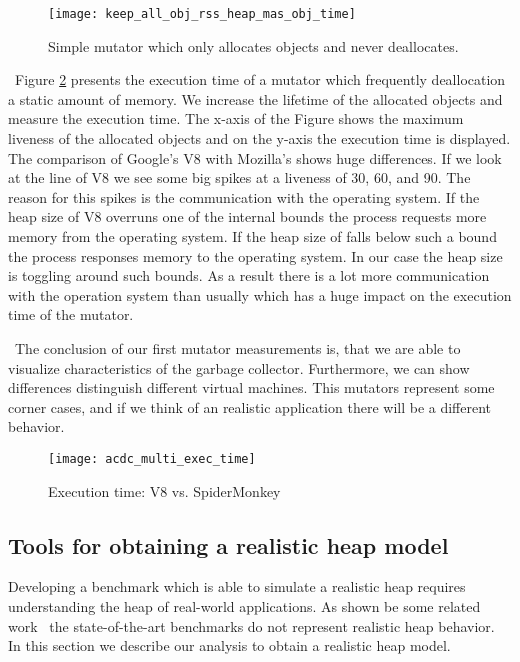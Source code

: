 \begin{figure}
	\centering
	\texttt{[image: keep\_all\_obj\_rss\_heap\_mas\_obj\_time]}
	\caption{Simple mutator which only allocates objects and never deallocates.}
	\label{fig:mutator_keep_all_obj}
\end{figure}
\
Figure \ref{fig:acdc_multi_exec_time} presents the execution time of a mutator which frequently deallocation a static amount of memory. We increase the lifetime of the allocated objects and measure the execution time. The x-axis of the Figure shows the maximum liveness of the allocated objects and on the y-axis the execution time is displayed. The comparison of Google's V8 with Mozilla's \SM shows huge differences. If we look at the line of V8 we see some big spikes at a liveness of 30, 60, and 90. The reason for this spikes is the communication with the operating system. If the heap size of V8 overruns one of the internal bounds the process requests more memory from the operating system. If the heap size of falls below such a bound the process responses memory to the operating system. In our case the heap size is toggling around such bounds. As a result there is a lot more communication with the operation system than usually which has a huge impact on the execution time of the mutator.

\
The conclusion of our first mutator measurements is, that we are able to visualize characteristics of the garbage collector. Furthermore, we can show differences distinguish different virtual machines. This mutators represent some corner cases, and if we think of an realistic \JS application there will be a different behavior.

\begin{figure}
	\centering
	\texttt{[image: acdc\_multi\_exec\_time]}
	\caption{Execution time: V8 vs. SpiderMonkey}
	\label{fig:acdc_multi_exec_time}
\end{figure}





\subsection{Tools for obtaining a realistic heap model}

Developing a benchmark which is able to simulate a realistic \JS heap requires understanding the heap of real-world applications. As shown be some related work~\cite{JSMeter2009,JSMeter2010,Richards2011} the state-of-the-art benchmarks do not represent realistic heap behavior. In this section we describe our analysis to obtain a realistic heap model.

